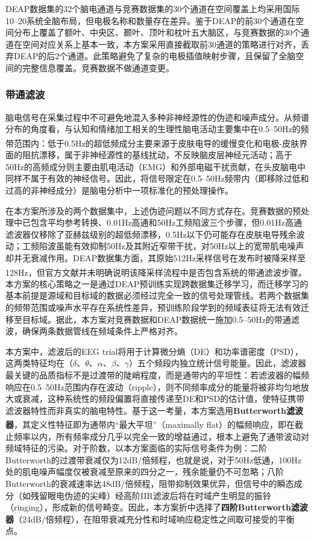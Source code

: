 \documentclass[UTF8,zihao=-4,fontset=windows]{ctexart}
\let\oldcite\cite
\renewcommand{\cite}[1]{\textsuperscript{\oldcite{#1}}}
\numberwithin{equation}{section}
\numberwithin{figure}{section}
\numberwithin{table}{section}
\begin{document}
DEAP数据集的32个脑电通道与竞赛数据集的30个通道在空间覆盖上均采用国际10--20系统全脑布局，但电极名称和数量存在差异。鉴于DEAP的前30个通道在空间分布上覆盖了额叶、中央区、颞叶、顶叶和枕叶五大脑区，与竞赛数据的30个通道在空间对应关系上基本一致，本方案采用直接截取前30通道的策略进行对齐，丢弃DEAP的后2个通道。此策略避免了复杂的电极插值映射步骤，且保留了全脑空间的完整信息覆盖。竞赛数据不做通道变更。

\subsubsection{带通滤波}

脑电信号在采集过程中不可避免地混入多种非神经源性的伪迹和噪声成分。从频谱分布的角度看，与认知和情绪加工相关的生理性脑电活动主要集中在0.5--50Hz的频带范围内\cite{eeg_preprocessing}：低于0.5Hz的超低频成分主要来源于皮肤电导的缓慢变化和电极-皮肤界面的阻抗漂移，属于非神经源性的基线扰动，不反映脑皮层神经元活动；高于50Hz的高频成分则主要由肌电活动（EMG）和外部电磁干扰贡献，在头皮脑电中同样不属于有效的神经信号。因此，将信号限定在0.5--50Hz频带内（即移除过低和过高的非神经成分）是脑电分析中一项标准化的预处理操作。

在本方案所涉及的两个数据集中，上述伪迹问题以不同方式存在。竞赛数据的预处理中已包含平均参考转换、0.01Hz高通和50Hz工频陷波三个步骤，但0.01Hz高通滤波器仅移除了亚赫兹级别的超低频漂移，0.5Hz以下仍可能存在皮肤电导残余波动；工频陷波虽能有效抑制50Hz及其附近窄带干扰，对50Hz以上的宽带肌电噪声却并无衰减作用。DEAP数据集方面，其原始512Hz采样信号在发布时被降采样至128Hz，但官方文献\cite{deap}并未明确说明该降采样流程中是否包含系统的带通滤波步骤。本方案的核心策略之一是通过DEAP预训练实现跨数据集迁移学习，而迁移学习的基本前提是源域和目标域的数据必须经过完全一致的信号处理管线。若两个数据集的频带范围或噪声水平存在系统性差异，预训练阶段学到的频域表征将无法有效迁移至目标域。据此，本方案对竞赛数据和DEAP数据统一施加0.5--50Hz的带通滤波，确保两条数据管线在频域条件上严格对齐。

本方案中，滤波后的EEG trial将用于计算微分熵（DE）和功率谱密度（PSD），这两类特征均在（$\delta$、$\theta$、$\alpha$、$\beta$、$\gamma$）五个频段内独立统计信号能量。因此，滤波器最关键的品质指标不是过渡带的陡峭程度，而是通带内的平坦性：若滤波器的幅频响应在0.5--50Hz范围内存在波动（ripple），则不同频率成分的能量将被非均匀地放大或衰减，这种系统性的频段偏置将直接传递至DE和PSD的估计值，使特征携带滤波器特性而非真实的脑电特性。基于这一考量，本方案选用\textbf{Butterworth滤波器}\cite{butterworth}，其定义性特征即为通带内“最大平坦”（maximally flat）的幅频响应，即在截止频率以内，所有频率成分几乎以完全一致的增益通过，根本上避免了通带波动对频域特征的污染。对于阶数，以本方案面临的实际信号条件为例：二阶Butterworth的过渡带衰减仅为12dB/倍频程，也就是说，对于50Hz低通，100Hz处的肌电噪声幅度仅被衰减至原来的四分之一，残余能量仍不可忽略；八阶Butterworth的衰减速率达48dB/倍频程，阻带抑制效果优异，但信号中的瞬态成分（如残留眼电伪迹的尖峰）经高阶IIR滤波后将在时域产生明显的振铃（ringing），形成新的信号畸变。因此，本方案折中选择了\textbf{四阶Butterworth滤波器}（24dB/倍频程），在阻带衰减充分性和时域响应稳定性之间取可接受的平衡点。
\end{document}
